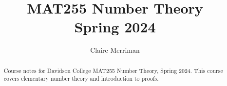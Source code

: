 \documentclass{xourse}
\title{MAT255 Number Theory\\Spring 2024}
\author{Claire Merriman}
\begin{document}
  
\begin{abstract} %
Course notes for Davidson College MAT255 Number Theory, Spring 2024. This course covers elementary number theory and introduction to proofs.
\end{abstract}  
\maketitle  
 
\chapterstyle
\sectionstyle  

\chapterstyle










\end{document}
